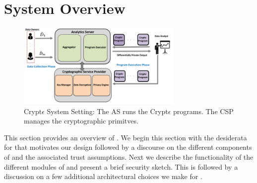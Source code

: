 \section{System Overview}

\begin{figure}\includegraphics[height=4.1cm,width=8cm]{cryptEdiag.png}\caption{ Crypt$\epsilon$ System Setting: The  \textsf{AS} runs the Crypt$\epsilon$ programs. The \textsf{CSP} manages the cryptographic primitves. } \end{figure}



This section provides an overview of \system. We begin this section with the desiderata for \system that motivates our design followed by a discourse on the different components of \system and the associated trust assumptions. Next we describe the functionality of the different modules of \system and present a brief security sketch. This is followed by a discussion on a few additional architectural choices we make for \system.

